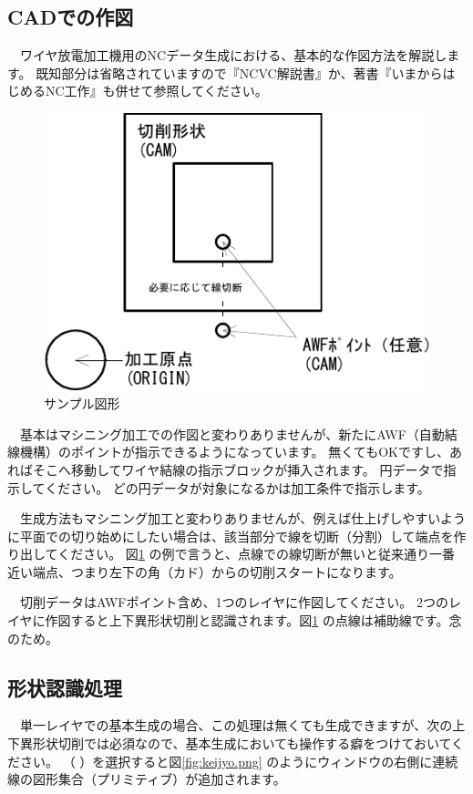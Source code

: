 

\subsection{CADでの作図}
　ワイヤ放電加工機用のNCデータ生成における、基本的な作図方法を解説します。
既知部分は省略されていますので『NCVC解説書』か、著書『いまからはじめるNC工作』も併せて参照してください。

\begin{figure}[H]
\centering
\includegraphics{No1/fig/sample1-crop.pdf}
\caption{サンプル図形}
\label{fig:sample1.pdf}
\end{figure}

　基本はマシニング加工での作図と変わりありませんが、新たにAWF（自動結線機構）のポイントが指示できるようになっています。
無くてもOKですし、あればそこへ移動してワイヤ結線の指示ブロックが挿入されます。
円データで指示してください。
どの円データが対象になるかは加工条件で指示します。

　生成方法もマシニング加工と変わりありませんが、例えば仕上げしやすいように平面での切り始めにしたい場合は、該当部分で線を切断（分割）して端点を作り出してください。
図\ref{fig:sample1.pdf} の例で言うと、点線での線切断が無いと従来通り一番近い端点、つまり左下の角（カド）からの切削スタートになります。

　切削データはAWFポイント含め、1つのレイヤに作図してください。
2つのレイヤに作図すると上下異形状切削と認識されます。図\ref{fig:sample1.pdf} の点線は補助線です。念のため。

\subsection{形状認識処理}
　単一レイヤでの基本生成の場合、この処理は無くても生成できますが、次の上下異形状切削では必須なので、基本生成においても操作する癖をつけておいてください。
（\,\,）を選択すると図\ref{fig:keijyo.png} のようにウィンドウの右側に連続線の図形集合（プリミティブ）が追加されます。

